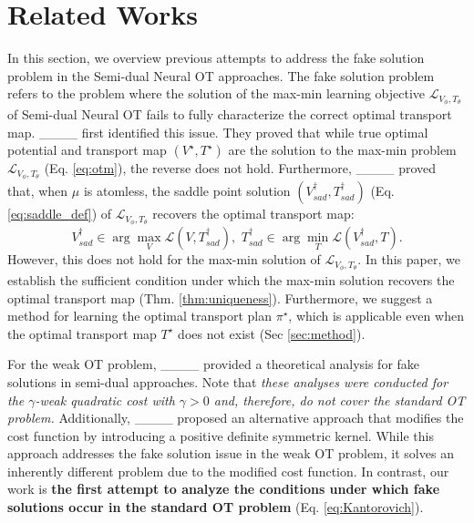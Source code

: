 \section{Related Works}
\label{sec:related_works}
In this section, we overview previous attempts to address the fake solution problem in the Semi-dual Neural OT approaches. The fake solution problem refers to the problem where the solution of the max-min learning objective $\mathcal{L}_{V_{\phi}, T_{\theta}}$ of Semi-dual Neural OT fails to fully characterize the correct optimal transport map. ____ first identified this issue. They proved that while true optimal potential and transport map $(V^{\star}, T^{\star})$ are the solution to the max-min problem $\mathcal{L}_{V_{\phi}, T_{\theta}}$ (Eq. \ref{eq:otm}), the reverse does not hold. Furthermore, ____ proved that, when $\mu$ is atomless, the saddle point solution $(V_{sad}^{\dagger}, T_{sad}^{\dagger})$ (Eq. \ref{eq:saddle_def}) of $\mathcal{L}_{V_{\phi}, T_{\theta}}$ recovers the optimal transport map:
\begin{equation} \label{eq:saddle_def}
        V_{sad}^{\dagger} \in \arg\max_{V} \mathcal{L} (V, T_{sad}^{\dagger}), \,\,
        T_{sad}^{\dagger} \in \arg\min_{T} \mathcal{L} (V_{sad}^{\dagger}, T).    
\end{equation} 
However, this does not hold for the max-min solution of $\mathcal{L}_{V_{\phi}, T_{\theta}}$. In this paper, we establish the sufficient condition under which the max-min solution recovers the optimal transport map (Thm. \ref{thm:uniqueness}). Furthermore, we suggest a method for learning the optimal transport plan $\pi^{\star}$, which is applicable even when the optimal transport map $T^{\star}$ does not exist (Sec \ref{sec:method}).

For the weak OT problem, ____ provided a theoretical analysis for fake solutions in semi-dual approaches. Note that \textit{these analyses were conducted for the $\gamma$-weak quadratic cost with $\gamma > 0$ and, therefore, do not cover the standard OT problem.} Additionally, ____ proposed an alternative approach that modifies the cost function by introducing a positive definite symmetric kernel. While this approach addresses the fake solution issue in the weak OT problem, it solves an inherently different problem due to the modified cost function. 
In contrast, our work is \textbf{the first attempt to analyze the conditions under which fake solutions occur in the standard OT problem} (Eq. \ref{eq:Kantorovich}).